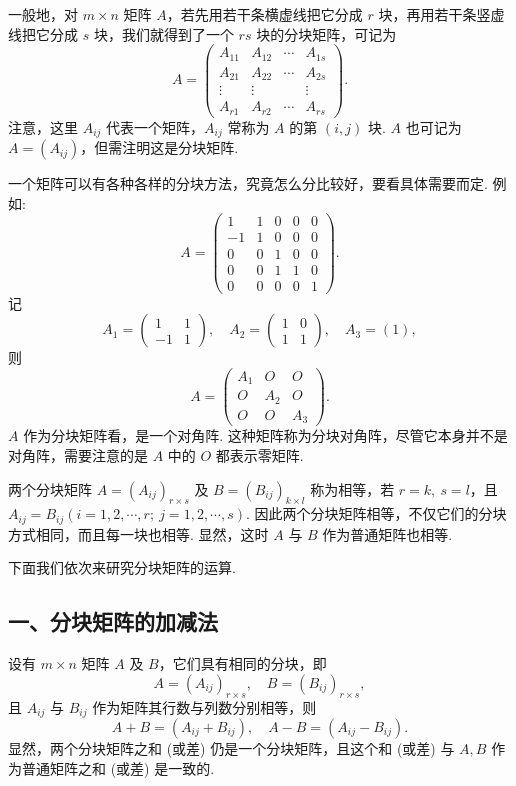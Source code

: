 \documentclass[UTF8, 12pt, fontset=fandol, oneside]{ctexart}
\begin{document}
一般地，对 $m\times n$ 矩阵 $A$，若先用若干条横虚线把它分成 $r$ 块，再用若干条竖虚线把它分成 $s$ 块，我们就得到了一个 $rs$ 块的分块矩阵，可记为
\[
A=\left(\begin{array}{cccc}
A_{11} & A_{12} & \cdots & A_{1s}\\
A_{21} & A_{22} & \cdots & A_{2s}\\
\vdots & \vdots & & \vdots\\
A_{r1} & A_{r2} & \cdots & A_{rs}
\end{array}\right).
\]
注意，这里 $A_{ij}$ 代表一个矩阵，$A_{ij}$ 常称为 $A$ 的第 $(i,j)$ 块. $A$ 也可记为 $A=(A_{ij})$，但需注明这是分块矩阵.

一个矩阵可以有各种各样的分块方法，究竟怎么分比较好，要看具体需要而定. 例如:
\[
A=\left(\begin{array}{cc|cc|c}
1 & 1 & 0 & 0 & 0\\
-1 & 1 & 0 & 0 & 0\\ \hline
0 & 0 & 1 & 0 & 0\\
0 & 0 & 1 & 1 & 0\\ \hline
0 & 0 & 0 & 0 & 1
\end{array}\right).
\]
记
\[
A_1=\left(\begin{array}{rr}
1 & 1\\
-1 & 1
\end{array}\right),\quad
A_2=\left(\begin{array}{rr}
1 & 0\\
1 & 1
\end{array}\right),\quad A_3=(1),
\]
则
\[
A=\left(\begin{array}{ccc}
A_1 & O & O\\
O & A_2 & O\\
O & O & A_3
\end{array}\right).
\]
$A$ 作为分块矩阵看，是一个对角阵. 这种矩阵称为分块对角阵，尽管它本身并不是对角阵，需要注意的是 $A$ 中的 $O$ 都表示零矩阵.

两个分块矩阵 $A=(A_{ij})_{r\times s}$ 及 $B=(B_{ij})_{k\times l}$ 称为相等，若 $r=k,\ s=l$，且 $A_{ij}=B_{ij}(i=1,2,\cdots,r;\ j=1,2,\cdots,s)$. 因此两个分块矩阵相等，不仅它们的分块方式相同，而且每一块也相等. 显然，这时 $A$ 与 $B$ 作为普通矩阵也相等.

下面我们依次来研究分块矩阵的运算.

\subsection*{一、分块矩阵的加减法}

设有 $m\times n$ 矩阵 $A$ 及 $B$，它们具有相同的分块，即
\[
A=(A_{ij})_{r\times s},\quad B=(B_{ij})_{r\times s},
\]
且 $A_{ij}$ 与 $B_{ij}$ 作为矩阵其行数与列数分别相等，则
\[
A+B=(A_{ij}+B_{ij}),\quad A-B=(A_{ij}-B_{ij}).
\]
显然，两个分块矩阵之和 (或差) 仍是一个分块矩阵，且这个和 (或差) 与 $A,B$ 作为普通矩阵之和 (或差) 是一致的.
\end{document}
